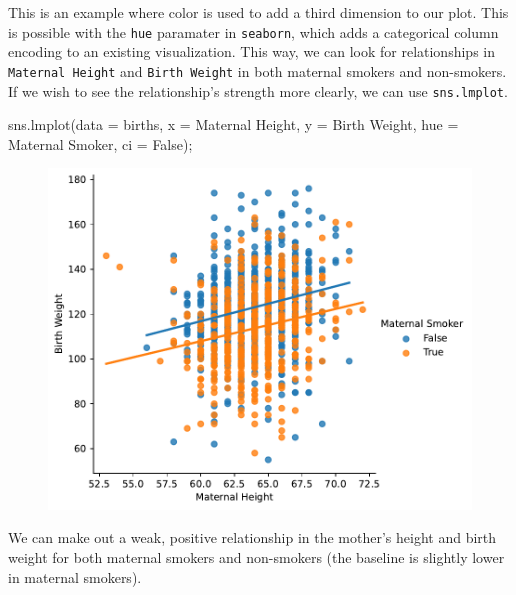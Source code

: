 \documentclass[
  letterpaper,
  DIV=11,
  numbers=noendperiod]{scrreprt}
\newenvironment{Shaded}{\begin{snugshade}}{\end{snugshade}}
\newcommand{\NormalTok}[1]{\textcolor[rgb]{0.00,0.23,0.31}{#1}}
\newcommand{\OperatorTok}[1]{\textcolor[rgb]{0.37,0.37,0.37}{#1}}
\newcommand{\StringTok}[1]{\textcolor[rgb]{0.13,0.47,0.30}{#1}}
\newcommand{\VariableTok}[1]{\textcolor[rgb]{0.07,0.07,0.07}{#1}}
\begin{document}
This is an example where color is used to add a third dimension to our
plot. This is possible with the \texttt{hue} paramater in
\texttt{seaborn}, which adds a categorical column encoding to an
existing visualization. This way, we can look for relationships in
\texttt{Maternal\ Height} and \texttt{Birth\ Weight} in both maternal
smokers and non-smokers. If we wish to see the relationship's strength
more clearly, we can use \texttt{sns.lmplot}.

\begin{Shaded}
\begin{Highlighting}[]
\NormalTok{sns.lmplot(data }\OperatorTok{=}\NormalTok{ births, x }\OperatorTok{=} \StringTok{\textquotesingle{}Maternal Height\textquotesingle{}}\NormalTok{, y }\OperatorTok{=} \StringTok{\textquotesingle{}Birth Weight\textquotesingle{}}\NormalTok{, }
\NormalTok{           hue }\OperatorTok{=} \StringTok{\textquotesingle{}Maternal Smoker\textquotesingle{}}\NormalTok{, ci }\OperatorTok{=} \VariableTok{False}\NormalTok{)}\OperatorTok{;}
\end{Highlighting}
\end{Shaded}

\begin{figure}[H]

{\centering \includegraphics{visualization_2/visualization_2_files/figure-pdf/cell-9-output-1.pdf}

}

\end{figure}

We can make out a weak, positive relationship in the mother's height and
birth weight for both maternal smokers and non-smokers (the baseline is
slightly lower in maternal smokers).
\end{document}

